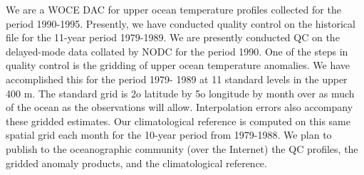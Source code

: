 \medskip
\large
{}
\normalsize
\medskip

	We are a WOCE DAC for upper ocean temperature profiles collected 
for the period 1990-1995. Presently, we have conducted quality control on 
the historical file for the 11-year period 1979-1989. We are presently 
conducted QC on the delayed-mode data collated by NODC for the period 
1990. One of the steps in quality control is the gridding of upper ocean 
temperature anomalies. We have accomplished this for the period 1979-
1989 at 11 standard levels in the upper 400 m. The standard grid is 2o 
latitude by 5o longitude by month over as much of the ocean as the 
observations will allow.  Interpolation errors also accompany these 
gridded estimates. Our climatological reference is computed on this same 
spatial grid each month for the 10-year period from 1979-1988.  We plan 
to publish to the oceanographic community (over the Internet) the QC 
profiles, the gridded anomaly products, and the climatological reference.
\newpage

